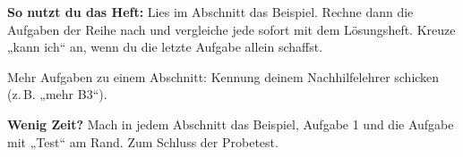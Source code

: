 \documentclass[11pt]{article}
\begin{document}
\par\smallskip
{}\par\medskip
\noindent\textbf{So nutzt du das Heft:} Lies im Abschnitt das Beispiel. Rechne dann die Aufgaben der Reihe nach und vergleiche jede sofort mit dem Lösungsheft. Kreuze „kann ich“ an, wenn du die letzte Aufgabe allein schaffst.\par
\noindent Mehr Aufgaben zu einem Abschnitt: Kennung deinem Nachhilfelehrer schicken (z.\,B. „mehr B3“).\par
\noindent\textbf{Wenig Zeit?} Mach in jedem Abschnitt das Beispiel, Aufgabe 1 und die Aufgabe mit „Test“ am Rand. Zum Schluss der Probetest.\par\medskip
\end{document}
